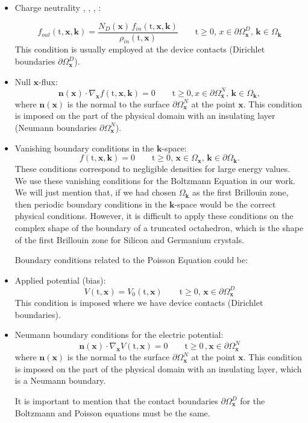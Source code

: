 \documentclass[11pt]{article}
\newcommand{\bk}{\mathbf{k}}
\newcommand{\bx}{\mathbf{x}}
\newcommand{\ti}{\mathrm{t}}
\newcommand{\domk}{\Omega_{\bk}}
\begin{document}
\begin{itemize}
\item 
Charge neutrality 
\cite{ref:CerciGambaLev}, \cite{cgms06}, 
\cite{Cheng_08_JCE_BP}, \cite{CGMS-CMAME2008}: 


\begin{equation}
f_{out}(\ti,\bx,\bk) = 
\dfrac{N_D(\bx) \, f_{in}(\ti,\bx,\bk)}{\rho_{in}(\ti,\bx)}
\qquad \ti \geq 0, \, x \in \partial \Omega^D_{\bx}, \, \bk \in \domk
\end{equation}
This condition is usually employed at the device contacts
(Dirichlet boundaries $\partial \Omega^D_{\bx} $). 
%
\item
Null $\bx$-flux:
%
\begin{equation}
\mathbf{n}(\bx) \cdot \nabla_{\bx} f(\ti,\bx,\bk) = 0 
\qquad \ti \geq 0, x \in \partial \Omega^N_{\bx}, \, \bk \in \domk,
\end{equation}
%
where $\mathbf{n}(\bx)$ is the normal to the surface $\partial \Omega^N_{\bx}$ at the point $\bx$.
This condition is imposed on the part of the physical domain with an
insulating layer (Neumann boundaries $\partial \Omega^N_{\bx}$).
%
\item
Vanishing boundary conditions in the $\bk$-space:
%
\begin{equation}
f(\ti,\bx,\bk) = 0
\qquad \ti \geq 0, \, \bx \in \Omega_{\bx}, \, \bk \in \partial \Omega_{\bk}.
\end{equation}
%
These conditions correspond to negligible densities 
for large energy values. We use these vanishing conditions for the Boltzmann Equation in our work.
We will just mention that, if we had chosen $\domk$ as the first Brillouin zone, then periodic boundary conditions in the $\bk$-space would be the correct physical conditions. 
However, 
it is difficult to apply these conditions on the complex shape of the boundary 
of a truncated octahedron, which is the shape of the first Brillouin zone for Silicon and Germanium crystals.


Boundary conditions related to the Poisson Equation could be:

\item
Applied potential (bias):
%
\begin{equation}
V(\ti,\bx)  =  V_{0}(\ti,\bx) 
\qquad \ti \geq 0, \, \bx \in \partial \Omega^D_{\bx} 
\end{equation}
This condition is imposed where we have device contacts (Dirichlet boundaries).
%
\item
Neumann boundary conditions for the electric potential:
%
\begin{equation}
\mathbf{n}(\bx) \cdot \nabla_{\bx} V(\ti,\bx) = 0 
\qquad \ti \geq 0 \, , \bx \in \partial \Omega^N_{\bx}
\end{equation}
%
where $\mathbf{n}(\bx)$ is the normal to the surface $\partial \Omega^N_{\bx}$ at the point $\bx$.
This condition is imposed on the part of the physical domain with an
insulating layer, which is a Neumann boundary.

It is important to mention that the contact boundaries $\partial \Omega^D_{\bx}$ for the Boltzmann and Poisson equations must be the same.


%
\end{itemize}
%
%
%
%
\end{document}
